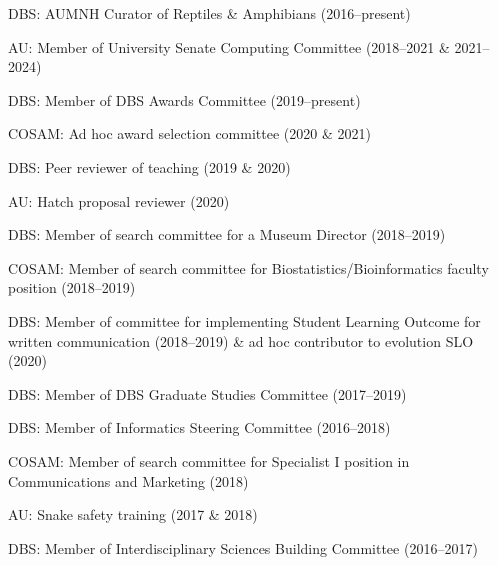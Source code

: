 \begin{veryTightItemize}
    \item DBS: AUMNH Curator of Reptiles \& Amphibians (2016--present)
    \item AU: Member of University Senate Computing Committee (2018--2021 \& 2021--2024)
    \item DBS: Member of DBS Awards Committee (2019--present)
    \item COSAM: Ad hoc award selection committee (2020 \& 2021)
    \item DBS: Peer reviewer of teaching (2019 \& 2020)
    \item AU: Hatch proposal reviewer (2020)
    \item DBS: Member of search committee for a Museum Director (2018--2019)
    \item COSAM: Member of search committee for Biostatistics/Bioinformatics
        faculty position (2018--2019)
    \item DBS: Member of committee for implementing Student Learning Outcome
        for written communication (2018--2019) \& ad hoc contributor to
        evolution SLO (2020)
    \item DBS: Member of DBS Graduate Studies Committee (2017--2019)
    \item DBS: Member of Informatics Steering Committee (2016--2018)
    \item COSAM: Member of search committee for Specialist I position in
        Communications and Marketing (2018)
    \item AU: Snake safety training (2017 \& 2018)
    \item DBS: Member of Interdisciplinary Sciences Building Committee (2016--2017)
\end{veryTightItemize}

